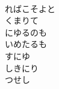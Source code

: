 \documentclass[10pt,b5j]{tarticle} %
\begin{document}
\begin{enumerate}
\begin{minipage}[c]{\blocksize}
    \end{minipage}
    \begin{minipage}[c]{\blocksize}
        
        \vspace{\linespace}
        \item~\\
        ればこそよと\\
        くまりて\\
        にゆるのも\\
        いめたるも\\
        すにゆ\\
        しきにり\\
        つせし

    
    \end{minipage}
\end{enumerate} %
\end{document}
